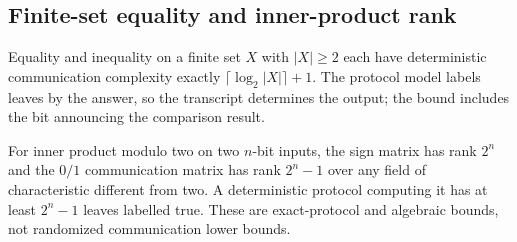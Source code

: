 \begin{result}
\subsection{Finite-set equality and inner-product rank}
Equality and inequality on a finite set $X$ with $|X|\ge2$ each have
deterministic communication complexity exactly $\lceil\log_2|X|\rceil+1$.
The protocol model labels leaves by the answer, so the transcript determines
the output; the bound includes the bit announcing the comparison result.

For inner product modulo two on two $n$-bit inputs, the sign matrix has rank
$2^n$ and the $0/1$ communication matrix has rank $2^n-1$ over any field of
characteristic different from two. A deterministic protocol computing it has
at least $2^n-1$ leaves labelled true. These are exact-protocol and algebraic
bounds, not randomized communication lower bounds.\citep{KushilevitzNisan1997}
\end{result}
